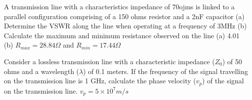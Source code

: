 \begin{mdframed}[backgroundcolor=lightblue, linewidth=1pt, hidealllines=true]
\begin{ExerciseList}
\Exercise[label={ex48}]
A transmission line with a characteristics impedance of 70ojms is linked to a parallel configuration comprising of a 150 ohms resistor and a 2nF capacitor
(a)	Determine the VSWR along the line when operating at a frequency of 3MHz
(b)	Calculate the maximum and minimum resistance observed on the line
\Answer[ref={ex48}]
(a)	4.01 \\
(b)	$R_{max} = 28.84\Omega$ and $R_{min} = 17.44\Omega$

\Exercise[label={ex49}]
Consider a lossless transmission line with a characteristic impedance ($Z_0$) of 50 ohms and a wavelength ($\lambda$) of 0.1 meters. If the frequency of the signal travelling on the transmission line is 1 GHz, calculate the phase velocity ($v_p$) of the signal on the transmission line.
\Answer[ref={ex49}]
$v_p=5\times10^7m/s$
\end{ExerciseList}
\end{mdframed}

